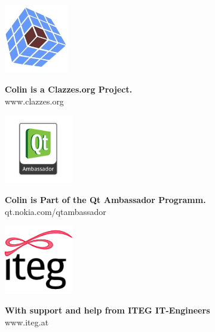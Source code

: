 
\begin{minipage}[h]{0.25\textwidth}
\begin{center}
\includegraphics[height=3cm]{./pictures/clazzes2.jpg}
\end{center}
\end{minipage}
\begin{minipage}[h]{0.75\textwidth}
\textbf{\large{Colin is a Clazzes.org Project.}}
\vspace{8pt}\\
www.clazzes.org
\end{minipage}
\vspace{20pt}
\hline
\vspace{20pt}
\begin{minipage}[h]{0.25\textwidth}
\begin{center}
\includegraphics[height=3cm]{./pictures/qt_ambassador_logo.png}
\end{center}
\end{minipage}
\begin{minipage}[h]{0.75\textwidth}
\textbf{\large{Colin is Part of the Qt Ambassador Programm.}}
\vspace{8pt}\\
qt.nokia.com/qtambassador
\end{minipage}
\vspace{20pt}
\hline
\vspace{20pt}
\begin{minipage}[h]{0.25\textwidth}
\begin{center}
\includegraphics[height=3cm]{./pictures/logo2-icon_128x128.png}
\end{center}
\end{minipage}
\begin{minipage}[h]{0.75\textwidth}
\textbf{\large{With support and help from ITEG IT-Engineers}}
\vspace{8pt}\\
www.iteg.at
\end{minipage}
\ \\

